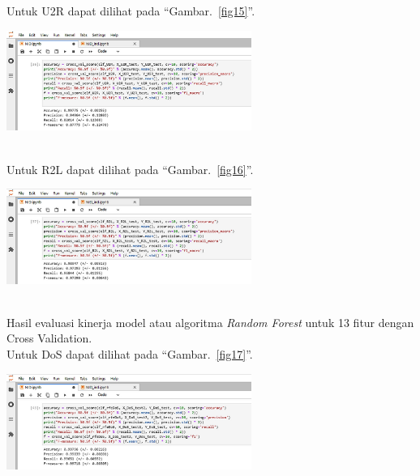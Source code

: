 \documentclass[conference]{IEEEtran}
\begin{document}
\noindent Untuk U2R dapat dilihat pada ``Gambar.~\ref{fig15}''.\\

\begin{minipage}{\linewidth}
\centerline{\includegraphics[width=80mm]{Gambar/Gbr14.jpg}}
\label{fig15}
\end{minipage}\\

\noindent Untuk R2L dapat dilihat pada ``Gambar.~\ref{fig16}''.\\

\begin{minipage}{\linewidth}
\centerline{\includegraphics[width=80mm]{Gambar/Gbr15.jpg}}
\label{fig16}
\end{minipage}\\

Hasil evaluasi kinerja model atau algoritma \emph{Random Forest} untuk 13 fitur dengan Cross Validation.\\
Untuk DoS dapat dilihat pada ``Gambar.~\ref{fig17}''.\\

\begin{minipage}{\linewidth}
\centerline{\includegraphics[width=80mm]{Gambar/Gbr16.jpg}}
\label{fig17}
\end{minipage}\\
\end{document}
